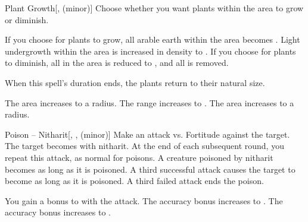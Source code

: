 \lowercase{\hypertarget{spell:Plant Growth}{}}\label{spell:Plant Growth}
\begin{freeability}[Rank 1]{\hypertarget{spell:Plant Growth}{Plant Growth}}[,  (minor)]
Choose whether you want plants within the area to grow or diminish.

If you choose for plants to grow, all arable earth within the area becomes .
Light undergrowth within the area is increased in density to .
If you choose for plants to diminish, all  in the area is reduced to , and all  is removed.

When this spell's duration ends, the plants return to their natural size.

\rankline
{} The area increases to a \arealarge radius.
 The range increases to \rnglong.
 The area increases to a \areahuge radius.
\end{freeability}
\vspace{0.25em}



\lowercase{\hypertarget{spell:Poison -- Nitharit}{}}\label{spell:Poison -- Nitharit}
\begin{freeability}[Rank 1]{\hypertarget{spell:Poison -- Nitharit}{Poison -- Nitharit}}[, ,  (minor)]
Make an attack vs. Fortitude against the target.
\hit The target becomes  with nitharit.
At the end of each subsequent round, you repeat this attack, as normal for poisons.
A creature poisoned by nitharit becomes  as long as it is poisoned.
A third successful attack causes the target to become  as long as it is poisoned.
A third failed attack ends the poison.

\rankline
{} You gain a  bonus to  with the attack.
 The accuracy bonus increases to .
 The accuracy bonus increases to .
\end{freeability}
\vspace{0.25em}



